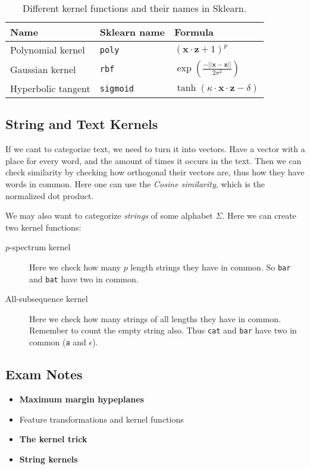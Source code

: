 \begin{table}[h]
    \centering

    \begin{tabular}{lll}
        \toprule
        Name & Sklearn name & Formula \\ \midrule
        Polynomial kernel & \texttt{poly} & $(\mathbf{x} \cdot \mathbf{z} + 1)^p$ \\
        Gaussian kernel  & \texttt{rbf} & $\exp\left(\frac {-||\mathbf{x} - \mathbf{z} ||} {2\sigma^2}\right)$ \\
        Hyperbolic tangent & \texttt{sigmoid} & $\tanh(\kappa \cdot \mathbf{x} \cdot \mathbf{z} - \delta)$ \\ \bottomrule
    \end{tabular}
    \caption{Different kernel functions and their names in Sklearn.}
\end{table}

\subsection{String and Text Kernels}

If we cant to categorize text, we need to turn it into vectors.
Have a vector with a place for every word, and the amount of times it occurs in the text.
Then we can check similarity by checking how orthogonal their vectors are, thus how they have words in common.
Here one can use the \emph{Cosine similarity}, which is the normalized dot product.

We may also want to categorize \emph{strings} of some alphabet $\Sigma$.
Here we can create two kernel functions:
\begin{description}
    \item[$p$-spectrum kernel] Here we check how many $p$ length strings they have in common.
        So \texttt{bar} and \texttt{bat} have two in common.
    \item[All-subsequence kernel] Here we check how many strings of all lengths they have in common.
        Remember to count the empty string also.
        Thus \texttt{cat} and \texttt{bar} have two in common (\texttt{a} and $\epsilon$).
\end{description}

\subsection{Exam Notes}

\begin{itemize}
    \item \textbf{Maximum margin hypeplanes}
    \item Feature transformations and kernel functions
    \item \textbf{The kernel trick}
    \item \textbf{String kernels}
\end{itemize}


